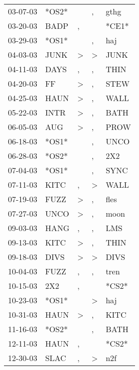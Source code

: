 \begin{supertabular}{lllll}
 03-07-03 &  *OS2* &                  &             , &   gthg \\
 03-20-03 &   BADP &                , &               &  *CE1* \\
 03-29-03 &  *OS1* &                  &             , &    haj \\
 04-03-03 &   JUNK &     \textgreater &  \textgreater &   JUNK \\
 04-11-03 &   DAYS &                , &             , &   THIN \\
 04-20-03 &     FF &     \textgreater &             , &   STEW \\
 04-25-03 &   HAUN &     \textgreater &             , &   WALL \\
 05-22-03 &   INTR &     \textgreater &             , &   BATH \\
 06-05-03 &    AUG &     \textgreater &             , &   PROW \\
 06-18-03 &  *OS1* &                  &             , &   UNCO \\
 06-28-03 &  *OS2* &                  &             , &    2X2 \\
 07-04-03 &  *OS1* &                  &             , &   SYNC \\
 07-11-03 &   KITC &                , &  \textgreater &   WALL \\
 07-19-03 &   FUZZ &     \textgreater &             , &   fles \\
 07-27-03 &   UNCO &     \textgreater &             , &   moon \\
 09-03-03 &   HANG &                , &             , &    LMS \\
 09-13-03 &   KITC &     \textgreater &             , &   THIN \\
 09-18-03 &   DIVS &     \textgreater &  \textgreater &   DIVS \\
 10-04-03 &   FUZZ &                , &             , &   tren \\
 10-15-03 &    2X2 &                , &               &  *CS2* \\
 10-23-03 &  *OS1* &                  &  \textgreater &    haj \\
 10-31-03 &   HAUN &     \textgreater &             , &   KITC \\
 11-16-03 &  *OS2* &                  &             , &   BATH \\
 12-11-03 &   HAUN &                , &               &  *CS2* \\
 12-30-03 &   SLAC &                , &  \textgreater &    n2f \\

\end{supertabular}
